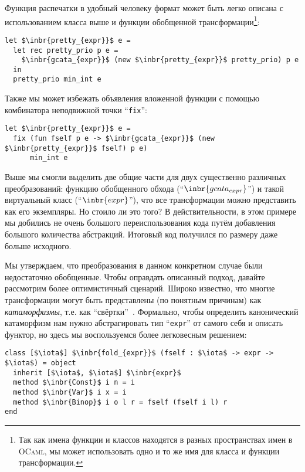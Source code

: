 Функция распечатки в удобный человеку формат может быть легко описана с использованием класса выше и функции обобщенной 
трансформации\footnote{Так как имена функции и классов находятся в разных пространствах имен в \textsc{OCaml}, мы может 
использовать одно и то же имя для класса и функции трансформации.}:

\begin{lstlisting}
let $\inbr{pretty_{expr}}$ e =
  let rec pretty_prio p e = 
    $\inbr{gcata_{expr}}$ (new $\inbr{pretty_{expr}}$ pretty_prio) p e 
  in
  pretty_prio min_int e
\end{lstlisting}

Также мы может избежать объявления вложенной функции с помощью комбинатора неподвижной точки ``\lstinline{fix}'':

\begin{lstlisting}
let $\inbr{pretty_{expr}}$ e =
  fix (fun fself p e -> $\inbr{gcata_{expr}}$ (new $\inbr{pretty_{expr}}$ fself) p e)
      min_int e
\end{lstlisting}

Выше мы смогли выделить две общие части для двух существенно различных преобразований: функцию обобщенного обхода
(``$\inbr{gcata_{expr}}$'') и такой виртуальный класс (``$\inbr{expr}$''), что все трансформации можно представить как его экземпляры.
Но стоило ли это того? В действительности, в этом примере мы добились не очень большого переиспользования кода путём добавления
большого количества абстракций. Итоговый код получился по размеру даже больше исходного.

Мы утверждаем, что преобразования в данном конкретном случае были недостаточно обобщенные. Чтобы оправдать описанный подход,
давайте рассмотрим более оптимистичный сценарий. Широко известно, что многие трансформации могут быть представлены 
(по понятным причинам) как \emph{катаморфизмы}, т.е. как ``свёртки''~\cite{Fold,Bananas,CalculatingFP}. 
Формально, чтобы определить канонический катаморфизм нам нужно абстрагировать тип ``\lstinline{expr}'' 
от самого себя и описать функтор, но здесь мы воспользуемся более легковесным решением:

\begin{lstlisting}
class [$\iota$] $\inbr{fold_{expr}}$ (fself : $\iota$ -> expr -> $\iota$) = object 
  inherit [$\iota$, $\iota$] $\inbr{expr}$ 
  method $\inbr{Const}$ i n = i
  method $\inbr{Var}$ i x = i
  method $\inbr{Binop}$ i o l r = fself (fself i l) r
end
\end{lstlisting}

